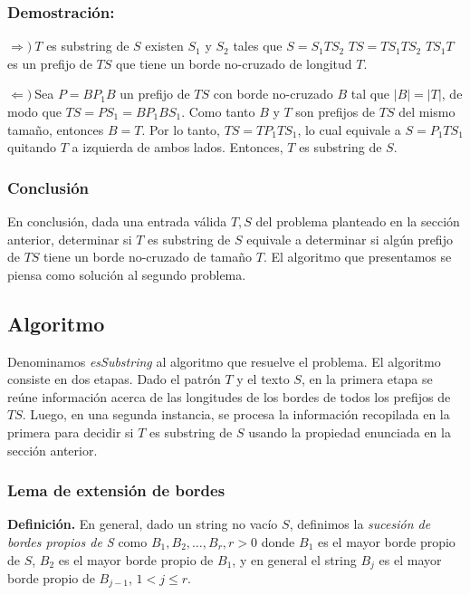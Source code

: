 \subsubsection{Demostración:}

$\Longrightarrow) \ $$T$ es substring de $S$ \spaciousimply existen $S_1$ y $S_2$ tales que $S = S_1 T S_2$ \spaciousimply $TS = T S_1 T S_2$ \spaciousimply $T S_1 T$ es un prefijo de $TS$ que tiene un borde no-cruzado de longitud $T$.

$\Longleftarrow) \ $Sea $P = B P_1 B$ un prefijo de $TS$ con borde no-cruzado $B$ tal que $|B| = |T|$, de modo que $TS = P S_1 = B P_1 B S_1$. Como tanto $B$ y $T$ son prefijos de $TS$ del mismo tamaño, entonces $B = T$. Por lo tanto, $TS = T P_1 T S_1$, lo cual equivale a $S = P_1 T S_1$ quitando $T$ a izquierda de ambos lados. Entonces, $T$ es substring de $S$.

\subsubsection{Conclusión}

En conclusión, dada una entrada válida $T, S$ del problema planteado en la sección anterior, determinar si $T$ es substring de $S$ equivale a determinar si algún prefijo de $TS$ tiene un borde no-cruzado de tamaño $T$. El algoritmo que presentamos se piensa como solución al segundo problema.

\subsection{Algoritmo}

Denominamos \textit{esSubstring} al algoritmo que resuelve el problema. El algoritmo consiste en dos etapas. Dado el patrón $T$ y el texto $S$, en la primera etapa se reúne información acerca de las longitudes de los bordes de todos los prefijos de $TS$. Luego, en una segunda instancia, se procesa la información recopilada en la primera para decidir si $T$ es substring de $S$ usando la propiedad enunciada en la sección anterior.

\subsubsection{Lema de extensión de bordes}

\textbf{Definición.} En general, dado un string no vacío $S$, definimos la \textit{sucesión de bordes propios de S} como $B_1, B_2, \dots, B_r, r > 0$ donde $B_1$ es el mayor borde propio de $S$, $B_2$ es el mayor borde propio de $B_1$, y en general el string $B_j$ es el mayor borde propio de $B_{j-1}$, $1 < j \leq r$.

